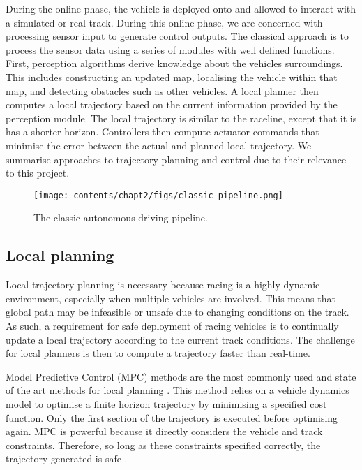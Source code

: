 During the online phase, the vehicle is deployed onto and allowed to interact with a simulated or real track.
During this online phase, we are concerned with processing sensor input to generate control outputs.
The classical approach is to process the sensor data using a series of modules with well defined functions.
First, perception algorithms derive knowledge about the vehicles surroundings. 
This includes constructing an updated map, localising the vehicle within that map, and detecting obstacles such as other vehicles. 
A local planner then computes a local trajectory based on the current information provided by the perception module.
The local trajectory is similar to the raceline, except that it is has a shorter horizon.
Controllers then compute actuator commands that minimise the error between the actual and planned local trajectory.
We summarise approaches to trajectory planning and control due to their relevance to this project.

\begin{figure}[h]
    \centering
    \texttt{[image: contents/chapt2/figs/classic\_pipeline.png]}
    \caption{The classic autonomous driving pipeline.}
    \label{fig:full_stack}
\end{figure}


\subsection{Local planning}
\label{sec:trajectory_planning}

Local trajectory planning is necessary because racing is a highly dynamic environment, especially when multiple vehicles are involved.
This means that global path may be infeasible or unsafe due to changing conditions on the track.
As such, a requirement for safe deployment of racing vehicles is to continually update a local trajectory according to the current track conditions.
The challenge for local planners is then to compute a trajectory faster than real-time.

Model Predictive Control (MPC) methods are the most commonly used and state of the art methods for local planning \cite{Betz2021}. 
This method relies on a vehicle dynamics model to optimise a finite horizon trajectory by minimising a specified cost function.
Only the first section of the trajectory is executed before optimising again.
MPC is powerful because it directly considers the vehicle and track constraints.
Therefore, so long as these constraints specified correctly, the trajectory generated is safe \cite{Schwenzer2021}.

